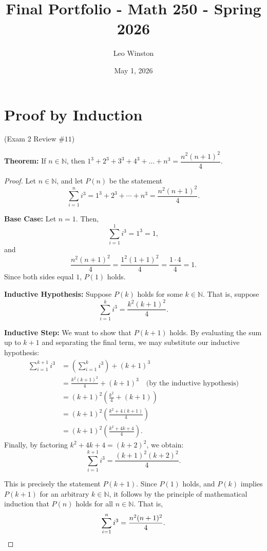 \documentclass[12pt]{amsart}
\title{Final Portfolio - Math 250 - Spring 2026}
\author{Leo Winston}
\date{May 1, 2026}
\begin{document}
\maketitle

\section{Proof by Induction}
\begin{center}(Exam 2 Review $\#11$)\end{center}

\textbf{Theorem:} If $n \in \mathbb{N}$, then 
$1^3+2^3+3^3+4^3+\dots+n^3=\dfrac{n^2(n+1)^2}{4}$.

\begin{proof}
Let $n \in \mathbb{N}$, and let $P(n)$ be the statement
\[
    \sum_{i=1}^{n} i^3 = 1^3 + 2^3 + \cdots + n^3 = \frac{n^2(n+1)^2}{4}.
\]

\textbf{Base Case:} Let $n = 1$. Then,
\[
    \sum_{i=1}^{1} i^3 = 1^3 = 1,
\]
and
\[
    \frac{n^2(n+1)^2}{4} = \frac{1^2(1+1)^2}{4} = \frac{1 \cdot 4}{4} = 1.
\]
Since both sides equal $1$, $P(1)$ holds.

\textbf{Inductive Hypothesis:} Suppose $P(k)$ holds for some $k \in \mathbb{N}$.
That is, suppose
\[
    \sum_{i=1}^{k} i^3 = \frac{k^2(k+1)^2}{4}.
\]

\textbf{Inductive Step:} We want to show that $P(k+1)$ holds. By evaluating the sum up to $k+1$ and separating the final term, we may substitute our inductive hypothesis:
\begin{align*}
    \sum_{i=1}^{k+1}i^3 
        &= \left(\sum_{i=1}^{k}i^3\right) + (k+1)^3 \\
        &= \frac{k^2(k+1)^2}{4} + (k+1)^3 \quad \text{(by the inductive hypothesis)} \\
        &= (k+1)^2 \left(\frac{k^2}{4} + (k+1)\right) \\
        &= (k+1)^2 \left(\frac{k^2 + 4(k+1)}{4}\right) \\
        &= (k+1)^2 \left(\frac{k^2 + 4k + 4}{4}\right).
\end{align*}
Finally, by factoring $k^2+4k+4 = (k+2)^2$, we obtain:
\[
    \sum_{i=1}^{k+1}i^3 = \frac{(k+1)^2(k+2)^2}{4}.
\]

\nopagebreak[4]
This is precisely the statement $P(k+1)$. Since $P(1)$ holds, and $P(k)$ implies $P(k+1)$ for an arbitrary $k \in \mathbb{N}$, it follows by the principle of mathematical induction that $P(n)$ holds for all $n \in \mathbb{N}$. That is,
\[
    \sum_{i=1}^{n} i^3 = \frac{n^2(n+1)^2}{4}. \qedhere
\]
\end{proof}
\end{document}
